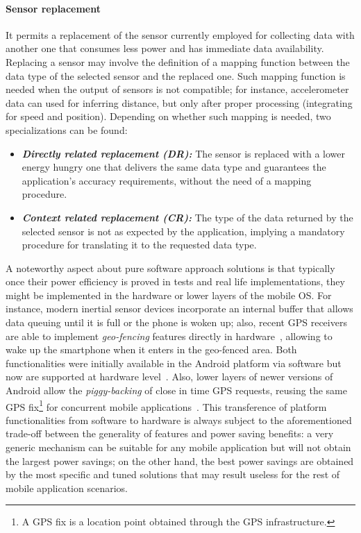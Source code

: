 \documentclass[ENG,PhD]{cinvestav}
\begin{document}
\paragraph{Sensor replacement}
It permits a replacement of the sensor currently employed for collecting data with another one that consumes less power and has immediate data availability.
Replacing a sensor may involve the definition of a mapping function between the data type of the selected sensor and the replaced one.
Such mapping function is needed when the output of sensors is not compatible; for instance, accelerometer data can used for inferring distance, but only after proper processing (integrating for speed and position).
Depending on whether such mapping is needed, two specializations can be found:
\begin{itemize}
  \item \emph{\textbf{Directly related replacement (DR):}} The sensor is replaced with a lower energy hungry one that delivers the same data type and guarantees the application's accuracy requirements, without the need of a mapping procedure.
  \item \emph{\textbf{Context related replacement (CR):}} The type of the data returned by the selected sensor is not as expected by the application, implying a mandatory procedure for translating it to the requested data type.
\end{itemize}

A noteworthy aspect about pure software approach solutions is that typically once their power efficiency is proved in tests and real life implementations, they might be implemented in the hardware or lower layers of the mobile OS.
For instance, modern inertial sensor devices incorporate an internal buffer that allows data queuing until it is full or the phone is woken up; also, recent GPS receivers are able to implement \emph{geo-fencing} features directly in hardware~\cite{Torroja2013}, allowing to wake up the smartphone when it enters in the geo-fenced area.
Both functionalities were initially available in the Android platform via software but now are supported at hardware level~\cite{Android2013,Developers2014}.
Also, lower layers of newer versions of Android allow the \emph{piggy-backing} of close in time GPS requests, reusing the same GPS fix\footnote{A GPS fix is a location point obtained through the GPS infrastructure.} for concurrent mobile applications~\cite{Zhuang2010}. 
This transference of platform functionalities from software to hardware is always subject to the aforementioned trade-off between the generality of features and power saving benefits: a very generic mechanism can be suitable for any mobile application but will not obtain the largest power savings; on the other hand, the best power savings are obtained by the most specific and tuned solutions that may result useless for the rest of mobile application scenarios.
\end{document}
